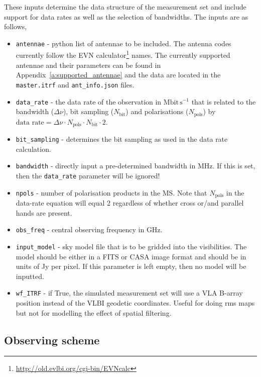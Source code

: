 \documentclass[11pt]{report_jfr}
\newcommand{\deff}{\fontfamily{lmss}\selectfont}
\begin{document}
These inputs determine the data structure of the measurement set and include support for data rates as well as the selection of bandwidths. The inputs are as follows,
%
\begin{itemize}
	\item \texttt{antennae} - python list of antennae to be included. The antenna codes currently follow the EVN calculator\footnote{\deff \href{http://old.evlbi.org/cgi-bin/EVNcalc}{http://old.evlbi.org/cgi-bin/EVNcalc}} names. The currently supported antennae and their parameters can be found in Appendix~\ref{a:supported_antennae} and the data are located in the \texttt{master.itrf} and \texttt{ant\_info.json} files. 
	\item \texttt{data\_rate} - the data rate of the observation in $\mathrm{Mbit\,s^{-1}}$ that is related to the bandwidth ($\Delta\nu$), bit sampling ($N_\mathrm{bit}$) and polarisations ($N_\mathrm{pols}$) by $\text{data rate} = \Delta\nu \cdot N_\mathrm{pols} \cdot N_\mathrm{bit}\cdot 2$. 
	\item \texttt{bit\_sampling} - determines the bit sampling as used in the data rate calculation.
	\item \texttt{bandwidth} - directly input a pre-determined bandwidth in MHz. If this is set, then the \texttt{data\_rate} parameter will be ignored!
	\item \texttt{npols} - number of polarisation products in the MS. Note that $N_\mathrm{pols}$ in the data-rate equation will equal 2 regardless of whether cross or/and parallel hands are present.
	\item \texttt{obs\_freq} - central observing frequency in GHz.
	\item \texttt{input\_model} - sky model file that is to be gridded into the visibilities. The model should be either in a FITS or CASA image format and should be in units of Jy per pixel. If this parameter is left empty, then no model will be inputted.
	\item \texttt{wf\_ITRF} - if True, the simulated measurement set will use a VLA B-array position instead of the VLBI geodetic coordinates. Useful for doing rms maps but not for modelling the effect of spatial filtering.
\end{itemize}

\subsection{Observing scheme}
\end{document}
